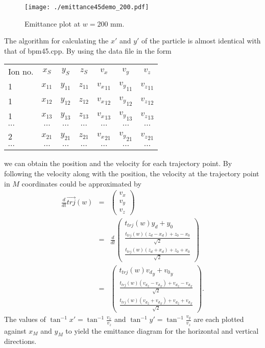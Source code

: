 \documentclass{article}
\begin{document}
\begin{figure}[H]
  \begin{center}
    \texttt{[image: ./emittance45demo\_200.pdf]}
    \caption{Emittance plot at $w = 200$ mm.\label{fig:emittance200}}
  \end{center}
\end{figure}


The algorithm for calculating the $x'$ and $y'$ of the particle is almost identical with that of bpm45.cpp. By using the data file in the form
\begin{table}[H]
  \begin{tabular}{lcccccc}
    Ion no. & $x_S$ & $y_S$  & $z_S$ & $v_x$ & $v_y$ & $v_z$ \\
    1 & $x_{11}$ & $y_{11}$ & $z_{11}$ & ${v_x}_{11}$ & ${v_y}_{11}$ & ${v_z}_{11}$ \\
    1 & $x_{12}$ & $y_{12}$ & $z_{12}$ & ${v_x}_{12}$ & ${v_y}_{12}$ & ${v_z}_{12}$ \\
    1 & $x_{13}$ & $y_{13}$ & $z_{13}$ & ${v_x}_{13}$ & ${v_y}_{13}$ & ${v_z}_{13}$ \\
    $\cdots$ & $\cdots$ & $\cdots$ & $\cdots$ & $\cdots$ & $\cdots$ & $\cdots$ \\
    2 & $x_{21}$ & $y_{21}$ & $z_{21}$ & ${v_x}_{21}$ & ${v_y}_{21}$ & ${v_z}_{21}$ \\
    $\cdots$ & $\cdots$ & $\cdots$ & $\cdots$ & $\cdots$ & $\cdots$ & $\cdots$ 
  \end{tabular}
\end{table}
we can obtain the position and the velocity for each trajectory point. By following the velocity along with the position, the velocity at the trajectory point in $M$ coordinates could be approximated by
\begin{eqnarray*}
\frac{d}{dt} \vec{trj}(w) & = & \left(
\begin{array}{c}
	v_x \\
	v_y \\
	v_z
\end{array} \right) \\
& = & \frac{d}{dt} \left(
\begin{array}{c}
	t_{trj}(w) y_d + y_0 \\
	\frac{t_{trj}(w) \left( z_d-x_d \right) + z_0-x_0}{\sqrt{2}} \\
	\frac{t_{trj}(w) \left( z_d+x_d \right) + z_0+x_0}{\sqrt{2}}
\end{array} \right) \\
& = & \left(
\begin{array}{c}
	t_{trj}(w) {v_d}_y + {v_0}_y \\
	\frac{t_{trj}(w) \left({v_d}_z-{v_d}_x\right) + {v_d}_z-{v_d}_x}{\sqrt{2}} \\
	\frac{t_{trj}(w) \left({v_d}_z+{v_d}_x\right) + {v_d}_z+{v_d}_x}{\sqrt{2}}
\end{array} \right).
\end{eqnarray*}
The values of $\tan^{-1}{x'} = \tan^{-1}{\frac{v_x}{v_z}}$ and $\tan^{-1}{y'} = \tan^{-1}{\frac{v_y}{v_z}}$ are each plotted against $x_M$ and $y_M$ to yield the emittance diagram for the horizontal and vertical directions.
\end{document}
